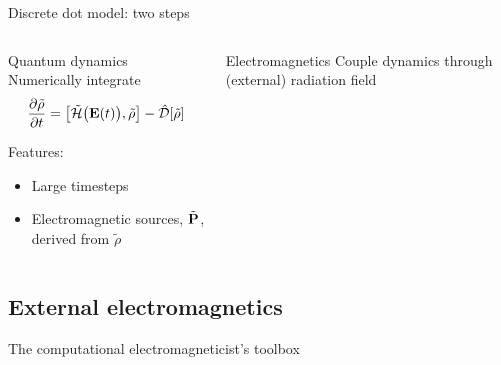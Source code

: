 \documentclass[aspectratio=169, usenames, dvipsnames]{beamer}
\begin{document}
\begin{frame}{Discrete dot model: two steps}
  \begin{columns}
    \begin{column}{0.5\textwidth}
      \begin{block}{Quantum dynamics}
        Numerically integrate
        \begin{equation*}
          \pdv{\tilde{\rho}}{t} = \commutator{\tilde{\mathcal{H}}\qty\big(\vb{E}(t))}{\tilde{\rho}} - \hat{\mathcal{D}}\qty[\tilde{\rho}]
        \end{equation*}

        Features:
        \begin{itemize}
          \item Large timesteps
          \item Electromagnetic sources, $\tilde{\vb{P}}$, derived from $\tilde{\rho}$
        \end{itemize}
      \end{block}
    \end{column}

    \begin{column}{0.5\textwidth}
      \begin{block}{Electromagnetics}
        Couple dynamics through (external) radiation field 
      \end{block}
    \end{column}
  \end{columns}
\end{frame}

\subsection{External electromagnetics}

\begin{frame}{The computational electromagneticist's toolbox}
    \vspace{-0.5cm}
      \begin{center}
        
      \end{center}
    \vspace{-1cm}
\end{frame}
\end{document}
